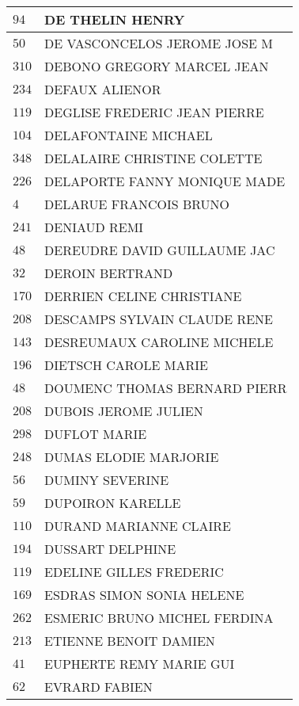 \begin{xltabular}{\linewidth}{|l|X|}
    \hline
    $94$ & DE THELIN HENRY \\
    \hline
    $50$ & DE VASCONCELOS JEROME JOSE M \\
    \hline
    $310$ & DEBONO GREGORY MARCEL JEAN \\
    \hline
    $234$ & DEFAUX ALIENOR \\
    \hline
    $119$ & DEGLISE FREDERIC JEAN PIERRE \\
    \hline
    $104$ & DELAFONTAINE MICHAEL \\
    \hline
    $348$ & DELALAIRE CHRISTINE COLETTE \\
    \hline
    $226$ & DELAPORTE FANNY MONIQUE MADE \\
    \hline
    $4$ & DELARUE FRANCOIS BRUNO \\
    \hline
    $241$ & DENIAUD REMI \\
    \hline
    $48$ & DEREUDRE DAVID GUILLAUME JAC \\
    \hline
    $32$ & DEROIN BERTRAND \\
    \hline
    $170$ & DERRIEN CELINE CHRISTIANE \\
    \hline
    $208$ & DESCAMPS SYLVAIN CLAUDE RENE \\
    \hline
    $143$ & DESREUMAUX CAROLINE MICHELE \\
    \hline
    $196$ & DIETSCH CAROLE MARIE \\
    \hline
    $48$ & DOUMENC THOMAS BERNARD PIERR \\
    \hline
    $208$ & DUBOIS JEROME JULIEN \\
    \hline
    $298$ & DUFLOT MARIE \\
    \hline
    $248$ & DUMAS ELODIE MARJORIE \\
    \hline
    $56$ & DUMINY SEVERINE \\
    \hline
    $59$ & DUPOIRON KARELLE \\
    \hline
    $110$ & DURAND MARIANNE CLAIRE \\
    \hline
    $194$ & DUSSART DELPHINE \\
    \hline
    $119$ & EDELINE GILLES FREDERIC \\
    \hline
    $169$ & ESDRAS SIMON SONIA HELENE \\
    \hline
    $262$ & ESMERIC BRUNO MICHEL FERDINA \\
    \hline
    $213$ & ETIENNE BENOIT DAMIEN \\
    \hline
    $41$ & EUPHERTE REMY MARIE GUI \\
    \hline
    $62$ & EVRARD FABIEN \\

\end{xltabular}
